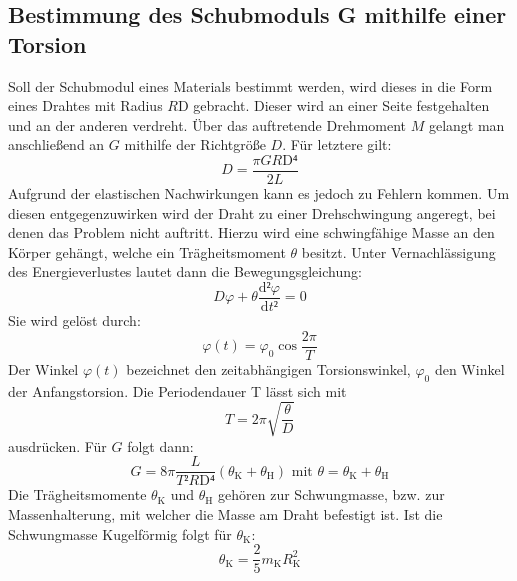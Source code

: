  \subsection{Bestimmung des Schubmoduls G mithilfe einer Torsion}
 Soll der Schubmodul eines Materials bestimmt werden, wird dieses in die Form eines Drahtes mit Radius $R\text{D}$ gebracht.
  Dieser wird an einer Seite festgehalten und an der anderen verdreht. Über das auftretende
   Drehmoment $M$ gelangt man anschließend an $G$ mithilfe der Richtgröße $D$. Für letztere gilt:
   \begin{equation}
     D = \frac{\pi GR\text{D}⁴}{2L}
   \end{equation}
Aufgrund der elastischen Nachwirkungen kann es jedoch zu Fehlern kommen.
Um diesen entgegenzuwirken wird der Draht zu einer Drehschwingung angeregt, bei denen das Problem nicht auftritt.
 Hierzu wird eine schwingfähige Masse an den Körper gehängt, welche ein Trägheitsmoment $\theta$ besitzt.
Unter Vernachlässigung des Energieverlustes lautet dann die Bewegungsgleichung:
\begin{equation}
  D\varphi + \theta\frac{\text{d}²\varphi}{\text{d}t²} = 0
\end{equation}
Sie wird gelöst durch:
\begin{equation}
\varphi(t) = \varphi_0 \cos\frac{2\pi}{T}
\end{equation}
Der Winkel $\varphi(t)$ bezeichnet den zeitabhängigen Torsionswinkel,
 $\varphi_\text{0}$ den Winkel der Anfangstorsion. Die Periodendauer T lässt sich mit
\begin{equation}
  T = 2\pi\sqrt{\frac{\theta}{D}}
\end{equation}
ausdrücken. Für $G$ folgt dann:
\begin{equation}
  G = 8\pi \frac{L}{T²R\text{D}⁴}(\theta_\text{K} + \theta_\text{H}) \text{ mit } \theta = \theta_\text{K} + \theta_\text{H}
\end{equation}
Die Trägheitsmomente $\theta_\text{K}$ und $\theta_\text{H}$ gehören zur Schwungmasse,
 bzw. zur Massenhalterung, mit welcher die Masse am Draht befestigt ist.
  Ist die Schwungmasse Kugelförmig folgt für $\theta_\text{K}$:
  \begin{equation}
    \theta_\text{K} = \frac{2}{5} m_\text{K} R_\text{K}^2
    \end{equation}

